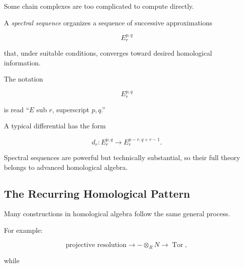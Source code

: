 Some chain complexes are too complicated to compute directly.

A \emph{spectral sequence} organizes a sequence of successive approximations

\[ E_r^{p,q} \]

that, under suitable conditions, converges toward desired homological
information.

The notation

\[ E_r^{p,q} \]

is read ``\(E\) sub \(r\), superscript \(p,q\).''

A typical differential has the form

\[ d_r:E_r^{p,q}\to E_r^{p-r,q+r-1}. \]

Spectral sequences are powerful but technically substantial, so their full
theory belongs to advanced homological algebra.

\subsection{The Recurring Homological Pattern}
\label{subsec:recurring-homological-pattern}

Many constructions in homological algebra follow the same general process.

\begin{center}
\end{center}

For example:

\[ \text{projective resolution}
\longrightarrow
-\otimes_RN
\longrightarrow
\operatorname{Tor}, \]

while

